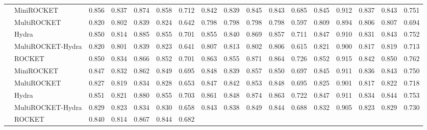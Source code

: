 \begin{table}[tbp]
{\begin{tabular}{llccccc|ccccc|ccccc}
              & MiniROCKET 
              & 0.856 & 0.837 & 0.874 & 0.858 & 0.712  
              & 0.842 & 0.839 & 0.845 & 0.843 & 0.685  
              & 0.845 & 0.912 & 0.837 & 0.843 & 0.751 \\
              & MultiROCKET
              & 0.820 & 0.802 & 0.839 & 0.824 & 0.642  
              & 0.798 & 0.798 & 0.798 & 0.798 & 0.597  
              & 0.809 & 0.894 & 0.806 & 0.807 & 0.694 \\
              & Hydra
              & 0.850 & 0.814 & 0.885 & 0.855 & 0.701  
              & 0.855 & 0.840 & 0.869 & 0.857 & 0.711  
              & 0.847 & 0.910 & 0.831 & 0.843 & 0.752 \\
              & MultiROCKET-Hydra
              & 0.820 & 0.801 & 0.839 & 0.823 & 0.641  
              & 0.807 & 0.813 & 0.802 & 0.806 & 0.615  
              & 0.821 & 0.900 & 0.817 & 0.819 & 0.713 \\
\midrule
{} 
              & ROCKET  
              & 0.850 & 0.834 & 0.866 & 0.852 & 0.701  
              & 0.863 & 0.855 & 0.871 & 0.864 & 0.726  
              & 0.852 & 0.915 & 0.842 & 0.850 & 0.762 \\
              & MiniROCKET 
              & 0.847 & 0.832 & 0.862 & 0.849 & 0.695  
              & 0.848 & 0.839 & 0.857 & 0.850 & 0.697  
              & 0.845 & 0.911 & 0.836 & 0.843 & 0.750 \\
              & MultiROCKET
              & 0.827 & 0.819 & 0.834 & 0.828 & 0.653  
              & 0.847 & 0.842 & 0.853 & 0.848 & 0.695  
              & 0.825 & 0.901 & 0.817 & 0.822 & 0.718 \\
              & Hydra
              & 0.851 & 0.821 & 0.880 & 0.855 & 0.703  
              & 0.861 & 0.848 & 0.874 & 0.863 & 0.722  
              & 0.847 & 0.911 & 0.834 & 0.844 & 0.753 \\
              & MultiROCKET-Hydra
              & 0.829 & 0.823 & 0.834 & 0.830 & 0.658  
              & 0.843 & 0.838 & 0.849 & 0.844 & 0.688  
              & 0.832 & 0.905 & 0.823 & 0.829 & 0.730 \\
\midrule
{} 
              & ROCKET  
              & 0.840 & 0.814 & 0.867 & 0.844 & 0.682  

\end{tabular}}
\end{table}
